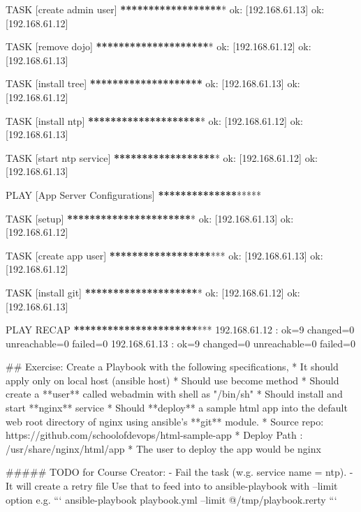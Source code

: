 TASK [create admin user] \textbf{**}\textbf{**}\textbf{**}\textbf{**}\textbf{**}\textbf{**}\textbf{**}\textbf{**}\textbf{**}*
ok: [192.168.61.13]
ok: [192.168.61.12]

TASK [remove dojo] \textbf{**}\textbf{**}\textbf{**}\textbf{**}\textbf{**}\textbf{**}\textbf{**}\textbf{**}\textbf{**}\textbf{**}*
ok: [192.168.61.12]
ok: [192.168.61.13]

TASK [install tree] \textbf{**}\textbf{**}\textbf{**}\textbf{**}\textbf{**}\textbf{**}\textbf{**}\textbf{**}\textbf{**}\textbf{**}
ok: [192.168.61.13]
ok: [192.168.61.12]

TASK [install ntp] \textbf{**}\textbf{**}\textbf{**}\textbf{**}\textbf{**}\textbf{**}\textbf{**}\textbf{**}\textbf{**}\textbf{**}*
ok: [192.168.61.12]
ok: [192.168.61.13]

TASK [start ntp service] \textbf{**}\textbf{**}\textbf{**}\textbf{**}\textbf{**}\textbf{**}\textbf{**}\textbf{**}\textbf{**}*
ok: [192.168.61.12]
ok: [192.168.61.13]

PLAY [App Server Configurations] \textbf{**}\textbf{**}\textbf{**}\textbf{**}\textbf{**}\textbf{**}\textbf{**}*****

TASK [setup] \textbf{**}\textbf{**}\textbf{**}\textbf{**}\textbf{**}\textbf{**}\textbf{**}\textbf{**}\textbf{**}\textbf{**}\textbf{**}*
ok: [192.168.61.13]
ok: [192.168.61.12]

TASK [create app user] \textbf{**}\textbf{**}\textbf{**}\textbf{**}\textbf{**}\textbf{**}\textbf{**}\textbf{**}\textbf{**}***
ok: [192.168.61.13]
ok: [192.168.61.12]

TASK [install git] \textbf{**}\textbf{**}\textbf{**}\textbf{**}\textbf{**}\textbf{**}\textbf{**}\textbf{**}\textbf{**}\textbf{**}*
ok: [192.168.61.12]
ok: [192.168.61.13]

PLAY RECAP \textbf{**}\textbf{**}\textbf{**}\textbf{**}\textbf{**}\textbf{**}\textbf{**}\textbf{**}\textbf{**}\textbf{**}\textbf{**}***
192.168.61.12              : ok=9    changed=0    unreachable=0    failed=0
192.168.61.13              : ok=9    changed=0    unreachable=0    failed=0

\begin{code}


## Exercise:
Create a Playbook with the following specifications,
  * It should apply only on local host (ansible host)
  * Should use become method
  * Should create a **user** called webadmin with shell as "/bin/sh"
  * Should install and start **nginx** service
  * Should **deploy** a sample html app into the default web root directory of nginx using ansible's **git** module.
    * Source repo:  https://github.com/schoolofdevops/html-sample-app
    * Deploy Path : /usr/share/nginx/html/app
    * The user to deploy the app would be nginx


#####  TODO for Course Creator:
   - Fail the task (w.g. service name = ntp).
   - It will create a retry file
   Use that to feed into to ansible-playbook with --limit option
   e.g.
   ```
    ansible-playbook playbook.yml --limit @/tmp/playbook.rerty
   ```
\end{code}